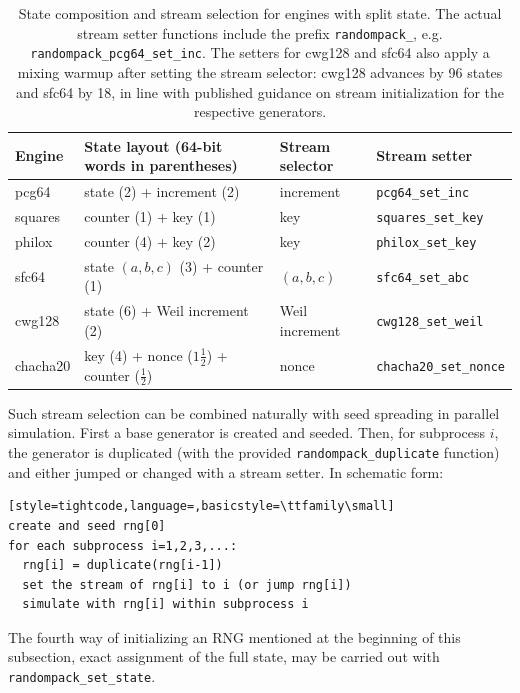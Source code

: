 \documentclass[manuscript,screen,review]{acmart}
\begin{document}
%
\begin{table}
  \caption{State composition and stream selection for engines with
    split state. The actual stream setter functions include the prefix
    \texttt{randompack\_}, e.g. \texttt{randompack\_pcg64\_set\_inc}.
    The setters for cwg128 and sfc64 also apply a mixing warmup after
    setting the stream selector: cwg128 advances by 96 states and
    sfc64 by 18, in line with published guidance on stream
    initialization for the respective generators.}
  \label{tab:stream-select}
  \begin{tabular}{llll}
    \toprule
    Engine   & State layout (64-bit words in parentheses)        & Stream selector  & Stream setter      \\
    \midrule
    pcg64    & state (2) + increment (2)                         & increment        & \texttt{pcg64\_set\_inc}      \\
    squares  & counter (1) + key (1)                             & key              & \texttt{squares\_set\_key}    \\
    philox   & counter (4) + key (2)                             & key              & \texttt{philox\_set\_key}     \\
    sfc64    & state $(a,b,c)$ (3) + counter (1)                 & $(a,b,c)$        & \texttt{sfc64\_set\_abc}      \\
    cwg128   & state (6) + Weil increment (2)                    & Weil increment   & \texttt{cwg128\_set\_weil}    \\
    chacha20 & key (4) + nonce ($1\tfrac{1}{2}$) + counter ($\tfrac{1}{2}$) & nonce & \texttt{chacha20\_set\_nonce} \\
    \bottomrule
  \end{tabular}
\end{table}
%
Such stream selection can be combined naturally with seed spreading in
parallel simulation. First a base generator is created and seeded.
Then, for subprocess $i$, the generator is duplicated (with the
provided \texttt{randompack\_duplicate} function) and either jumped or
changed with a stream setter. In schematic form:
%
\begin{lstlisting}[style=tightcode,language=,basicstyle=\ttfamily\small]
create and seed rng[0]
for each subprocess i=1,2,3,...:
  rng[i] = duplicate(rng[i-1])
  set the stream of rng[i] to i (or jump rng[i])
  simulate with rng[i] within subprocess i
\end{lstlisting}

The fourth way of initializing an RNG mentioned at the beginning of
this subsection, exact assignment of the full state, may be carried out
with \texttt{randompack\_set\_state}.
\end{document}
